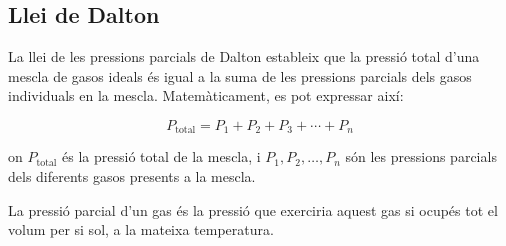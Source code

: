\subsection{Llei de Dalton}
La llei de les pressions parcials de Dalton estableix que la pressió total d'una mescla de gasos ideals és igual a la suma de les pressions parcials dels gasos individuals en la mescla. Matemàticament, es pot expressar així:

\[
P_{\text{total}} = P_1 + P_2 + P_3 + \cdots + P_n
\]

on \(P_{\text{total}}\) és la pressió total de la mescla, i \(P_1, P_2, \dots, P_n\) són les pressions parcials dels diferents gasos presents a la mescla.

La pressió parcial d'un gas és la pressió que exerciria aquest gas si ocupés tot el volum per si sol, a la mateixa temperatura.
  


